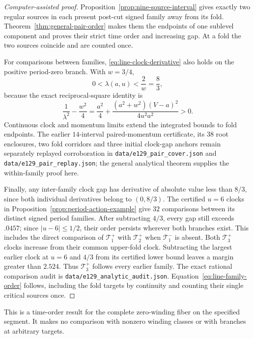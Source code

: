 \documentclass[11pt,a4paper]{article}
\theoremstyle{remark}\newtheorem{remark}[theorem]{Remark}
\begin{document}
\begin{proof}[Computer-assisted proof]
Proposition~\ref{prop:nine-source-interval} gives exactly two regular
sources in each present post-cut signed family away from its fold.
Theorem~\ref{thm:general-pair-order} makes them the endpoints of one
sublevel component and proves their strict time order and increasing gap.
At a fold the two sources coincide and are counted once.

For comparisons between families, \eqref{eq:line-clock-derivative}
also holds on the positive period-zero branch. With $w=3/4$,
\begin{equation}\label{eq:line-clock-bound}
 0<\lambda(a,u)<\frac2w=\frac83,
\end{equation}
because the exact reciprocal-square identity is
\[
 \frac1{\lambda^2}-\frac{w^2}{4}
 =\frac{a^2}{4}
   +\frac{(a^2+w^2)(V-a)^2}{4u^2a^2}>0.
\]
Continuous clock and momentum limits extend the integrated bounds to
fold endpoints. The earlier $14$-interval paired-momentum certificate,
its $38$ root enclosures, two fold corridors and three initial clock-gap
anchors remain separately replayed corroboration in
\nolinkurl{data/e129_pair_cover.json} and
\nolinkurl{data/e129_pair_replay.json}; the general analytical theorem
supplies the within-family proof here.

Finally, any inter-family clock gap has derivative of absolute value less
than $8/3$, since both individual derivatives belong to $(0,8/3)$.
The certified $u=6$ clocks in Proposition~\ref{prop:period-action-example}
give $32$ comparisons between its distinct signed period families.
After subtracting $4/3$, every gap still exceeds $.0457$; since
$|u-6|\le1/2$, their order persists wherever both branches exist.
This includes the direct comparison of $\mathcal T_1^+$ with
$\mathcal T_2^+$ when $\mathcal T_1^-$ is absent. Both
$\mathcal T_3^+$ clocks increase from their common upper-fold clock.
Subtracting the largest earlier clock at $u=6$ and $4/3$ from its
certified lower bound leaves a margin greater than $2.524$.
Thus $\mathcal T_3^+$ follows every earlier family. The exact rational
comparison audit is \nolinkurl{data/e129_analytic_audit.json}.
Equation~\eqref{eq:line-family-order} follows, including the fold targets
by continuity and counting their single critical sources once.
\end{proof}

This is a time-order result for the complete zero-winding fiber on the
specified segment. It makes no comparison with nonzero winding classes
or with branches at arbitrary targets.
\end{document}
